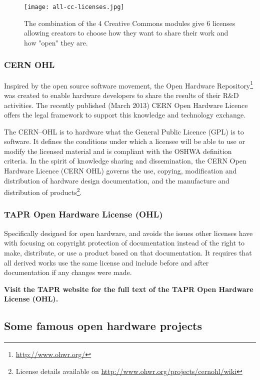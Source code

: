 \begin{figure}[]
    \begin{center}
        \texttt{[image: all-cc-licenses.jpg]}
    \end{center}
    \caption{The combination of the 4 Creative Commons modules give 6 licenses allowing creators to choose how they want to share their work and how "open" they are.}
    \label{fig:all-cc-licenses}
\end{figure}

\subsubsection{CERN OHL} %

Inspired by the open source software movement, the Open Hardware Repository\footnote{\url{http://www.ohwr.org/}} was created to enable hardware developers to share the results of their R\&D activities. The recently published (March 2013) CERN Open Hardware Licence offers the legal framework to support this knowledge and technology exchange.

The CERN–OHL is to hardware what the General Public Licence (GPL) is to software. It defines the conditions under which a licensee will be able to use or modify the licensed material and is compliant with the OSHWA definition criteria. In the spirit of knowledge sharing and dissemination, the CERN Open Hardware Licence (CERN OHL) governs the use, copying, modification and distribution of hardware design documentation, and the manufacture and distribution of products\footnote{License details available on \url{http://www.ohwr.org/projects/cernohl/wiki}}.


\subsubsection{TAPR Open Hardware License (OHL)}
Specifically designed for open hardware, and avoids the issues other licenses have with focusing on copyright protection of documentation instead of the right to make, distribute, or use a product based on that documentation. It requires that all derived works use the same license and include before and after documentation if any changes were made.

\textbf{Visit the TAPR website for the full text of the TAPR Open Hardware License (OHL).}


\subsection{Some famous open hardware projects} %

